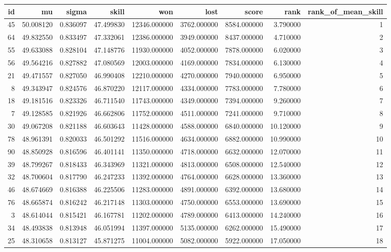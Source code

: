 \begin{tabular}{rrrrrrrrr}
\toprule
id & mu & sigma & skill & won & lost & score & rank & rank_of_mean_skill \\
\midrule
45 & 50.008120 & 0.836097 & 47.499830 & 12346.000000 & 3762.000000 & 8584.000000 & 3.790000 & 1 \\
64 & 49.832550 & 0.833497 & 47.332061 & 12386.000000 & 3949.000000 & 8437.000000 & 4.710000 & 2 \\
55 & 49.633088 & 0.828104 & 47.148776 & 11930.000000 & 4052.000000 & 7878.000000 & 6.020000 & 3 \\
56 & 49.564216 & 0.827882 & 47.080569 & 12003.000000 & 4169.000000 & 7834.000000 & 6.130000 & 4 \\
21 & 49.471557 & 0.827050 & 46.990408 & 12210.000000 & 4270.000000 & 7940.000000 & 6.950000 & 5 \\
8 & 49.343947 & 0.824576 & 46.870220 & 12117.000000 & 4334.000000 & 7783.000000 & 7.780000 & 6 \\
18 & 49.181516 & 0.823326 & 46.711540 & 11743.000000 & 4349.000000 & 7394.000000 & 9.260000 & 7 \\
7 & 49.128585 & 0.821926 & 46.662806 & 11752.000000 & 4511.000000 & 7241.000000 & 9.710000 & 8 \\
30 & 49.067208 & 0.821188 & 46.603643 & 11428.000000 & 4588.000000 & 6840.000000 & 10.120000 & 9 \\
78 & 48.961391 & 0.820033 & 46.501292 & 11516.000000 & 4634.000000 & 6882.000000 & 10.990000 & 10 \\
90 & 48.850928 & 0.816596 & 46.401141 & 11350.000000 & 4718.000000 & 6632.000000 & 12.070000 & 11 \\
39 & 48.799267 & 0.818433 & 46.343969 & 11321.000000 & 4813.000000 & 6508.000000 & 12.540000 & 12 \\
32 & 48.700604 & 0.817790 & 46.247233 & 11392.000000 & 4764.000000 & 6628.000000 & 13.360000 & 13 \\
46 & 48.674669 & 0.816388 & 46.225506 & 11283.000000 & 4891.000000 & 6392.000000 & 13.680000 & 14 \\
76 & 48.665874 & 0.816242 & 46.217148 & 11303.000000 & 4750.000000 & 6553.000000 & 13.690000 & 15 \\
3 & 48.614044 & 0.815421 & 46.167781 & 11202.000000 & 4789.000000 & 6413.000000 & 14.240000 & 16 \\
34 & 48.493838 & 0.813948 & 46.051994 & 11397.000000 & 5135.000000 & 6262.000000 & 15.490000 & 17 \\
25 & 48.310658 & 0.813127 & 45.871275 & 11004.000000 & 5082.000000 & 5922.000000 & 17.050000 & 18 \\

\end{tabular}
